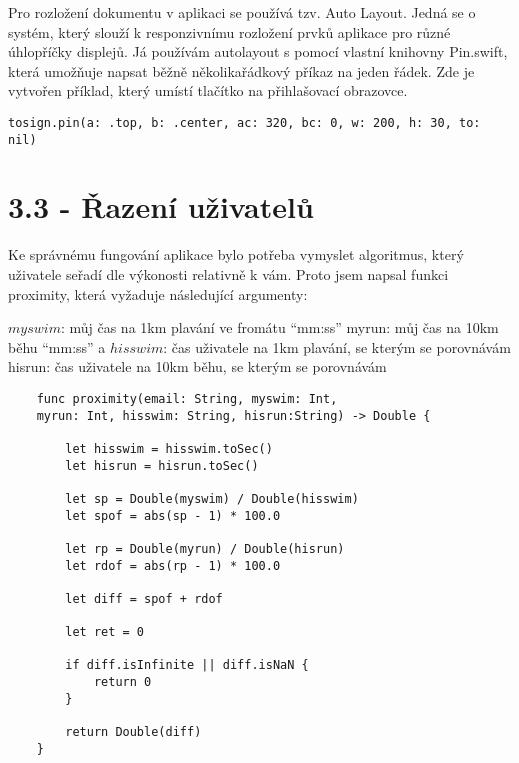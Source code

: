 \documentclass{article}
\begin{document}
Pro rozložení dokumentu v aplikaci se používá tzv. Auto Layout. Jedná se o systém, který slouží k responzivnímu rozložení prvků aplikace pro různé úhlopříčky displejů. 
Já používám autolayout s pomocí vlastní knihovny Pin.swift, která umožňuje napsat běžně několikařádkový příkaz na jeden řádek. Zde je vytvořen příklad, který umístí tlačítko na přihlašovací obrazovce.



\vspace{10 mm}
\begin{verbatim}
tosign.pin(a: .top, b: .center, ac: 320, bc: 0, w: 200, h: 30, to: nil)
\end{verbatim}


\vspace{10 mm}
\section{3.3 - Řazení uživatelů}

Ke správnému fungování aplikace bylo potřeba vymyslet algoritmus, který uživatele seřadí dle výkonosti relativně k vám. Proto jsem napsal funkci proximity, která vyžaduje následující argumenty:

$myswim$: můj čas na 1km plavání ve fromátu “mm:ss”
myrun: můj čas na 10km běhu “mm:ss” a 
$hisswim$: čas uživatele na 1km plavání, se kterým se porovnávám 
hisrun: čas uživatele na 10km běhu, se kterým se porovnávám 



\vspace{10 mm}
  \begin{verbatim}
    func proximity(email: String, myswim: Int,
    myrun: Int, hisswim: String, hisrun:String) -> Double {
        
        let hisswim = hisswim.toSec()
        let hisrun = hisrun.toSec()
        
        let sp = Double(myswim) / Double(hisswim)       
        let spof = abs(sp - 1) * 100.0
        
        let rp = Double(myrun) / Double(hisrun)
        let rdof = abs(rp - 1) * 100.0
        
        let diff = spof + rdof
        
        let ret = 0
        
        if diff.isInfinite || diff.isNaN {
            return 0
        }
        
        return Double(diff)
    }
 \end{verbatim}
\end{document}
